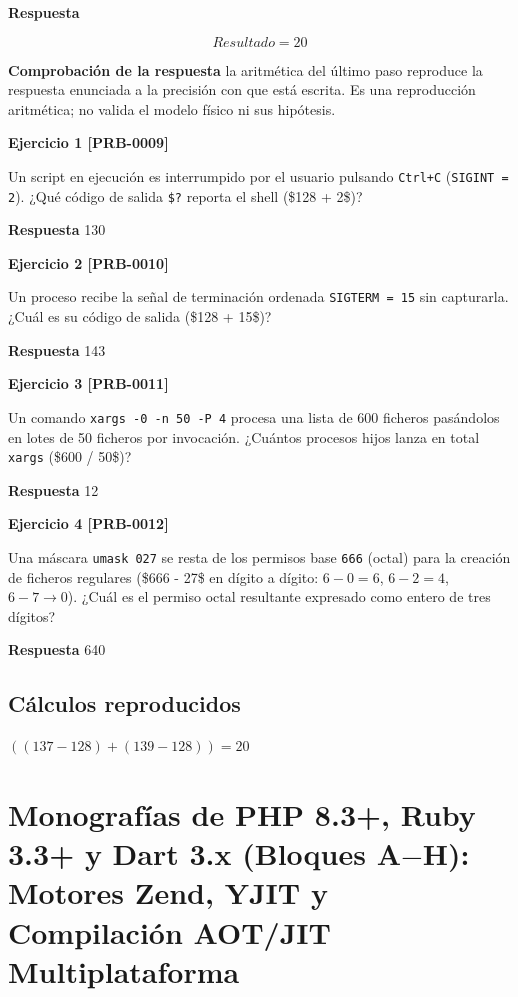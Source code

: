 \documentclass{book}
\begin{document}
\noindent\textbf{Respuesta}

\[
Resultado = 20
\]

\noindent\textbf{Comprobación de la respuesta} la aritmética del último paso reproduce la respuesta enunciada a la precisión con que está escrita. Es una reproducción aritmética; no valida el modelo físico ni sus hipótesis.

\noindent\textbf{Ejercicio 1 [PRB-0009]}

Un script en ejecución es interrumpido por el usuario pulsando \texttt{Ctrl+C} (\texttt{SIGINT = 2}). ¿Qué código de salida \texttt{\$?} reporta el shell (\$128 + 2\$)?

\noindent\textbf{Respuesta} 130

\noindent\textbf{Ejercicio 2 [PRB-0010]}

Un proceso recibe la señal de terminación ordenada \texttt{SIGTERM = 15} sin capturarla. ¿Cuál es su código de salida (\$128 + 15\$)?

\noindent\textbf{Respuesta} 143

\noindent\textbf{Ejercicio 3 [PRB-0011]}

Un comando \texttt{xargs -0 -n 50 -P 4} procesa una lista de 600 ficheros pasándolos en lotes de 50 ficheros por invocación. ¿Cuántos procesos hijos lanza en total \texttt{xargs} (\$600 / 50\$)?

\noindent\textbf{Respuesta} 12

\noindent\textbf{Ejercicio 4 [PRB-0012]}

Una máscara \texttt{umask 027} se resta de los permisos base \texttt{666} (octal) para la creación de ficheros regulares (\$666 - 27\$ en dígito a dígito: \(6-0=6\), \(6-2=4\), \(6-7\to 0\)). ¿Cuál es el permiso octal resultante expresado como entero de tres dígitos?

\noindent\textbf{Respuesta} 640

\subsection*{Cálculos reproducidos}

\(\left(\left(137-128\right)+\left(139-128\right)\right) = 20\)

\section{Monografías de PHP 8.3+, Ruby 3.3+ y Dart 3.x (Bloques A\(-\)H): Motores Zend, YJIT y Compilación AOT/JIT Multiplataforma}
\end{document}
